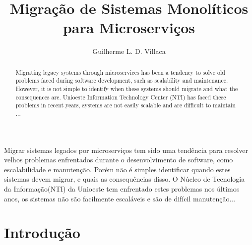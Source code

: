 \documentclass[12pt]{article}
\title{Migração de Sistemas Monolíticos para Microserviços}
\author{Guilherme L. D. Villaca\inst{1}}
\begin{document}
 

\maketitle

\begin{abstract}
Migrating legacy systems through microservices has been a tendency to solve old problems faced during software development, such as scalability and maintenance. However, it is not simple to identify when these systems should migrate and what the consequences are. Unioeste Information Technology Center (NTI) has faced these problems in recent years, systems are not easily scalable and are difficult to maintain ...
\end{abstract}
     
\begin{resumo} 
Migrar sistemas legados por microserviços tem sido uma tendência para resolver velhos problemas enfrentados durante o desenvolvimento de software, como escalabilidade e manutenção. Porém não é simples identificar quando estes sistemas devem migrar, e quais as consequências disso. O Núcleo de Tecnologia da Informação(NTI) da Unioeste tem enfrentado estes problemas nos últimos anos, os sistemas não são facilmente escaláveis e são de difícil manutenção...
\end{resumo}


\section{Introdução}
\end{document}
